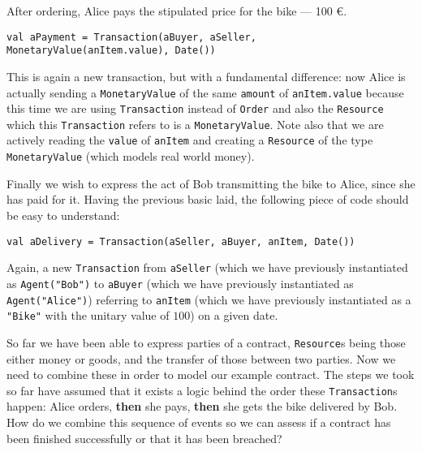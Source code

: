 \documentclass{ituthesis}
\begin{document}
After ordering, Alice pays the stipulated price for the bike --- 100 €.
\begin{lstlisting}
val aPayment = Transaction(aBuyer, aSeller, MonetaryValue(anItem.value), Date())
\end{lstlisting}
This is again a new transaction, but with a fundamental difference: now Alice is actually sending a \texttt{MonetaryValue} of the same \texttt{amount} of \texttt{anItem.value} because this time we are using \texttt{Transaction} instead of \texttt{Order} and also the \texttt{Resource} which this \texttt{Transaction} refers to is a \texttt{MonetaryValue}. Note also that we are actively reading the \texttt{value} of \texttt{anItem} and creating a \texttt{Resource} of the type \texttt{MonetaryValue} (which models real world money).

Finally we wish to express the act of Bob transmitting the bike to Alice, since she has paid for it. Having the previous basic laid, the following piece of code should be easy to understand:
\begin{lstlisting}
val aDelivery = Transaction(aSeller, aBuyer, anItem, Date())
\end{lstlisting}
Again, a new \texttt{Transaction} from \texttt{aSeller} (which we have previously instantiated as \texttt{Agent("Bob")} to \texttt{aBuyer} (which we have previously instantiated as \texttt{Agent("Alice")}) referring to \texttt{anItem} (which we have previously instantiated as a \texttt{"Bike"} with the unitary value of $100$) on a given date.

So far we have been able to express parties of a contract, \texttt{Resource}s being those either money or goods, and the transfer of those between two parties. Now we need to combine these in order to model our example contract. The steps we took so far have assumed that it exists a logic behind the order these \texttt{Transaction}s happen: Alice orders, \textbf{then} she pays, \textbf{then} she gets the bike delivered by Bob. How do we combine this sequence of events so we can assess if a contract has been finished successfully or that it has been breached?
\end{document}

